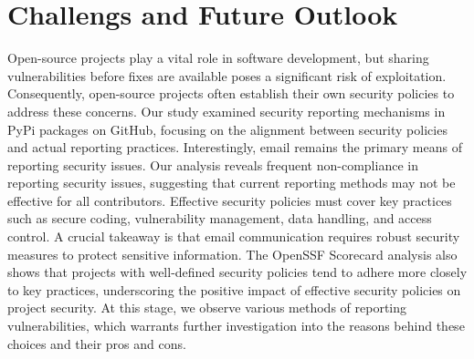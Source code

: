\section{Challengs and Future Outlook}
\label{6_conclusion}

Open-source projects play a vital role in software development, but sharing vulnerabilities before fixes are available poses a significant risk of exploitation. Consequently, open-source projects often establish their own security policies to address these concerns. Our study examined security reporting mechanisms in PyPi packages on GitHub, focusing on the alignment between security policies and actual reporting practices. Interestingly, email remains the primary means of reporting security issues. Our analysis reveals frequent non-compliance in reporting security issues, suggesting that current reporting methods may not be effective for all contributors.
Effective security policies must cover key practices such as secure coding, vulnerability management, data handling, and access control. A crucial takeaway is that email communication requires robust security measures to protect sensitive information. The OpenSSF Scorecard analysis also shows that projects with well-defined security policies tend to adhere more closely to key practices, underscoring the positive impact of effective security policies on project security. At this stage, we observe various methods of reporting vulnerabilities, which warrants further investigation into the reasons behind these choices and their pros and cons.




